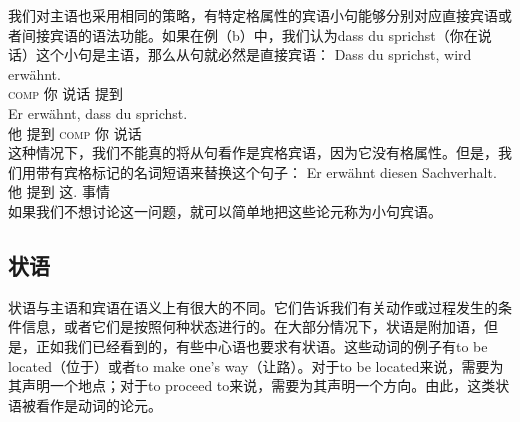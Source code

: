 我们对主语也采用相同的策略，有特定格属性的宾语小句能够分别对应直接宾语或者间接宾语的语法功能。如果在例（b）中，我们认为dass du sprichst（你在说话）这个小句是主语，那么从句就必然是直接宾语：
\eal
\ex\label{Beispiel-dass-du-sprichst} 
\gll Dass du sprichst, wird erwähnt.\\
     \textsc{comp} 你 说话 \passiveprs{} 提到\\
\ex
\gll Er erwähnt, dass du sprichst.\\
	 他 提到 \textsc{comp} 你 说话\\
\zl
这种情况下，我们不能真的将从句看作是宾格宾语，因为它没有格属性。但是，我们用带有宾格标记的名词短语来替换这个句子：
\ea
\gll Er erwähnt diesen Sachverhalt.\\
	 他 提到 这.\acc{} 事情\\
\z
如果我们不想讨论这一问题，就可以简单地把这些论元称为小句宾语。


\subsection{状语}
\label{sec-Adverbiale}
状语与主语和宾语在语义上有很大的不同。它们告诉我们有关动作或过程发生的条件信息，或者它们是按照何种状态进行的。在大部分情况下，状语是附加语，但是，正如我们已经看到的，有些中心语也要求有状语。这些动词的例子有to be located（位于）或者to make one's way（让路）。对于to be located来说，需要为其声明一个地点；对于to proceed to来说，需要为其声明一个方向。由此，这类状语被看作是动词的论元。

